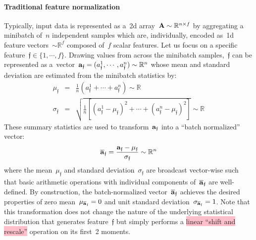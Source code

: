 \documentclass{article}
\begin{document}
\paragraph{Traditional feature normalization}  Typically, input data is represented as a~2d array~${\bf A} \sim \mathbb{R}^{n\times f}$ by aggregating a minibatch of~$n$ independent samples which are, individually, encoded as~1d feature vectors~$\sim \mathbb{R}^f$ composed of~$f$ scalar features. Let us focus on a specific feature~$\mathfrak{f} \in \{ 1, \cdots , f \} $.  Drawing values from across the minibatch samples,~$\mathfrak{f}$ can be represented as a~vector~${\bf a}_\mathfrak{f} = (a_\mathfrak{f}^1 , \cdots , a_\mathfrak{f}^n ) \sim \mathbb{R}^n$ whose mean and standard deviation are estimated from the minibatch statistics by:
\begin{eqnarray}
\mu_\mathfrak{f} &=& \frac{1}{n} \left( a_\mathfrak{f}^1 + \cdots + a_\mathfrak{f}^n \right) \sim \mathbb{R} \label{def::BNmu} \\
\sigma_\mathfrak{f} &=& \sqrt{\frac{1}{n} \left[ \left( a_\mathfrak{f}^1 - \mu_\mathfrak{f} \right)^2 + \cdots + \left( a_\mathfrak{f}^n - \mu_\mathfrak{f} \right)^2 \right]} \sim \mathbb{R} \label{def::BNsig}
\end{eqnarray}
These summary statistics are used to transform~${\bf a}_\mathfrak{f}$ into a ``batch normalized'' vector:
\begin{equation}
\overline{\bf a}_\mathfrak{f} = \frac{{\bf a}_\mathfrak{f} - \mu_\mathfrak{f}}{ \sigma_\mathfrak{f}} \sim \mathbb{R}^n
\label{eq:minibatchNorm}
\end{equation}
where the mean~$\mu_\mathfrak{f}$ and standard deviation~$\sigma_\mathfrak{f}$ are broadcast vector-wise such that basic arithmetic operations with individual components of~$\overline{\bf a}_\mathfrak{f}$ are well-defined.  By construction, the batch-normalized vector~$\overline{\bf a}_\mathfrak{f}$ achieves the desired properties of zero mean~$\mu_{\overline{\bf a}_\mathfrak{f}}=0$ and unit standard deviation~$\sigma_{\overline{\bf a}_\mathfrak{f}}=1$.  Note that this transformation does not change the nature of the underlying statistical distribution that generates feature~$\mathfrak{f}$ but simply performs a \colorbox{pink}{linear ``shift and rescale''} operation on its first~2 moments. \\
\end{document}
